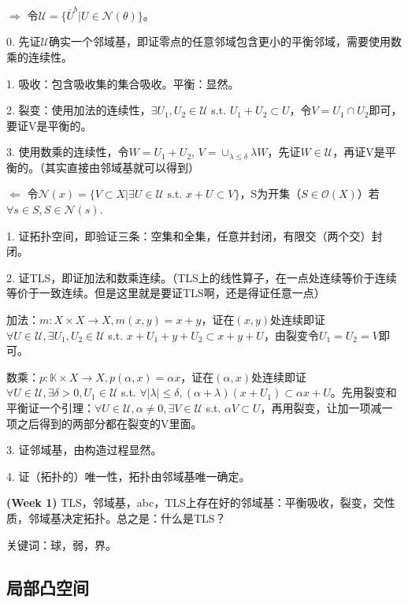 \begin{pf}
  $\Rightarrow$ 令$\mathcal{U} = \{ \bar{U}^b | U \in \mathcal{N}(\theta) \}$。

  0. 先证$\mathcal{U}$确实一个邻域基，即证零点的任意邻域包含更小的平衡邻域，需要使用数乘的连续性。

  1. 吸收：包含吸收集的集合吸收。平衡：显然。

  2. 裂变：使用加法的连续性，$\exists U_1, U_2 \in \mathcal{U}$ s.t. $U_1 + U_2 \subset U$，令$V = U_1 \cap U_2$即可，要证V是平衡的。

  3. 使用数乘的连续性，令$W = U_1 + U_2$, $V = \cup_{\lambda \le \delta} \lambda W$，先证$W \in \mathcal{U}$，再证V是平衡的。（其实直接由邻域基就可以得到）

  $\Leftarrow$ 令$\mathcal{N}(x) = \{ V \subset X | \exists U \in \mathcal{U} \text{ s.t. } x + U \subset V \}$，S为开集（$S \in \mathcal{O}(X)$）若$\forall s \in S, S \in \mathcal{N}(s)$.

  1. 证拓扑空间，即验证三条：空集和全集，任意并封闭，有限交（两个交）封闭。

  2. 证TLS，即证加法和数乘连续。（TLS上的线性算子，在一点处连续等价于连续等价于一致连续。但是这里就是要证TLS啊，还是得证任意一点）

  加法：$m: X \times X \to X, m(x, y) = x + y$，证在$(x, y)$处连续即证$\forall U \in \mathcal{U}, \exists U_1, U_2 \in \mathcal{U}$ s.t. $x + U_1 + y + U_2 \subset x + y + U$，由裂变令$U_1 = U_2 = V$即可。

  数乘：$p: \mathbb{K} \times X \to X, p(\alpha, x) = \alpha x$，证在$(\alpha, x)$处连续即证$\forall U \in \mathcal{U}, \exists \delta > 0, U_1 \in \mathcal{U}$ s.t. $\forall |\lambda| \le \delta, (\alpha + \lambda)(x + U_1) \subset \alpha x + U$。先用裂变和平衡证一个引理：$\forall U \in \mathcal{U}, \alpha \neq 0, \exists V \in \mathcal{U}$ s.t. $\alpha V \subset U$，再用裂变，让加一项减一项之后得到的两部分都在裂变的V里面。

  3. 证邻域基，由构造过程显然。

  4. 证（拓扑的）唯一性，拓扑由邻域基唯一确定。
\end{pf}

\begin{conc}
  \textbf{(Week 1)} TLS，邻域基，abc，TLS上存在好的邻域基：平衡吸收，裂变，交性质，邻域基决定拓扑。总之是：什么是TLS？
\end{conc}

关键词：球，弱，界。

\subsection{局部凸空间}

